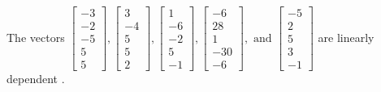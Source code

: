 \begin{exercise}
\begin{exerciseStatement}
  \end{exerciseStatement}
  \begin{exerciseAnswer}
   The vectors \(\left[\begin{array}{r}
-3 \\
-2 \\
-5 \\
5 \\
5
\end{array}\right] , \left[\begin{array}{r}
3 \\
-4 \\
5 \\
5 \\
2
\end{array}\right] , \left[\begin{array}{r}
1 \\
-6 \\
-2 \\
5 \\
-1
\end{array}\right] , \left[\begin{array}{r}
-6 \\
28 \\
1 \\
-30 \\
-6
\end{array}\right] , \text{ and } \left[\begin{array}{r}
-5 \\
2 \\
5 \\
3 \\
-1
\end{array}\right]\) are 
  	 linearly dependent  .
  


  \end{exerciseAnswer}
\end{exercise}